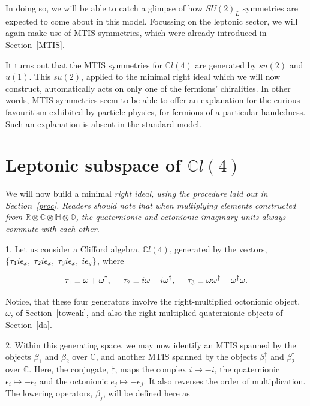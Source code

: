 \documentclass[letterpaper,12pt,titlepage,oneside,final]{book}
\newcommand{\C}{\mathbb{C}}
\newcommand{\RCHO}{\mathbb{R}\otimes\mathbb{C}\otimes\mathbb{H}\otimes\mathbb{O}}
\newcommand{\CLfour}{\mathbb{C}l(4)}
\newcommand{\oot}{\omega \omega^{\dagger}}
\newcommand{\oto}{\omega ^{\dagger}\omega }
\begin{document}
In doing so, we will be able to catch a glimpse of how $SU(2)_L$ symmetries are expected to come about in this model.  Focussing on the leptonic sector, we will again make use of MTIS symmetries, which were already introduced in Section~\ref{MTIS}.  

It turns out that the MTIS symmetries for $\CLfour$ are generated by $su(2)$ and $u(1)$.  This $su(2)$, applied to the minimal right ideal which we will now construct, automatically acts on only one of the fermions' chiralities.  In other words, MTIS symmetries seem to be able to offer an explanation for the curious favouritism exhibited by particle physics, for fermions of a particular handedness.  Such an explanation is absent in the standard model.


\section{Leptonic subspace of $\CLfour$  }

We will now build a minimal \it right \rm ideal, using the procedure laid out in Section~\ref{proc}.  Readers should note that when multiplying elements constructed from $\RCHO$, the quaternionic and octonionic imaginary units always commute with each other.

\vspace{1cm}

1.  Let us consider a Clifford algebra, $\CLfour$, generated by the vectors, $\{\tau_1 i\epsilon_x, \hspace{1mm} \tau_2 i\epsilon_x, \hspace{1mm}\tau_3 i\epsilon_x, \hspace{1mm} i\epsilon_y\}$,  where 

\begin{equation}
\tau_1 \equiv \omega + \omega^{\dagger}, \hspace{5mm} \tau_2 \equiv i\omega -i \omega^{\dagger}, \hspace{5mm} \tau_3 \equiv \oot - \oto.
\end{equation}

 \noindent Notice, that these four generators involve the right-multiplied octonionic object, $\omega$, of Section~\ref{toweak}, and also the right-multiplied quaternionic objects of Section~\ref{da}.

\vspace{7mm}

2.  Within this generating space, we may now identify an MTIS spanned by the objects $\beta_1$ and $\beta_2$ over $\C$, and another MTIS spanned by the objects $\beta_1^{\ddag}$ and $\beta_2^{\ddag}$ over $\C$.  Here, the conjugate, $\ddag$, maps the complex $i\mapsto-i$, the quaternionic $\epsilon_i\mapsto -\epsilon_i$ and the octonionic $e_j \mapsto -e_j$.  It also reverses the order of multiplication.  The lowering operators, $\beta_j$, will be defined here as 
\end{document}
